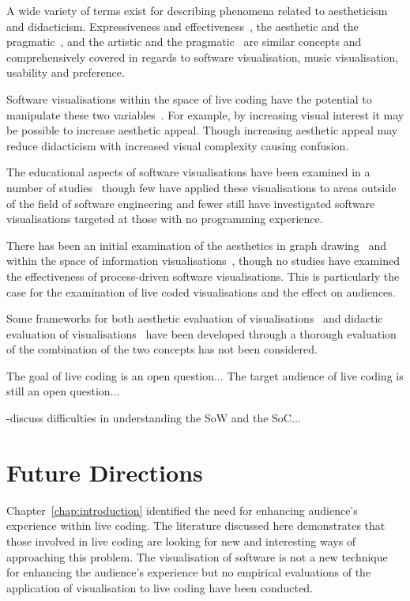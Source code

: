 A wide variety of terms exist for describing phenomena related to aestheticism and didacticism. Expressiveness and effectiveness~\cite{Hundhausen1996,Hundhausen2002}, the aesthetic and the pragmatic~\cite{Angeli2006}, and the artistic and the pragmatic~\cite{Kosara2007} are similar concepts and comprehensively covered in regards to software visualisation, music visualisation, usability and preference.

Software visualisations within the space of live coding have the potential to manipulate these two variables~\cite{Iru,McLean2010a}. For example, by increasing visual interest it may be possible to increase aesthetic appeal. Though increasing aesthetic appeal may reduce didacticism with increased visual complexity causing confusion.

The educational aspects of software visualisations have been examined in a number of studies~\cite{Baecker1998,Hundhausen2007} though few have applied these visualisations to areas outside of the field of software engineering and fewer still have investigated software visualisations targeted at those with no programming experience.

There has been an initial examination of the aesthetics in graph drawing~\cite{Purchase1996,Purchase2001} and within the space of information visualisations~\cite{Cawthon2007,Bell}, though no studies have examined the effectiveness of process-driven software visualisations. This is particularly the case for the examination of live coded visualisations and the effect on audiences.

Some frameworks for both aesthetic evaluation of visualisations~\cite{Cawthon2007,Purchase1996} and didactic evaluation of visualisations~\cite{VanWijk2005} have been developed through a thorough evaluation of the combination of the two concepts has not been considered.

The goal of live coding is an open question...
The target audience of live coding is still an open question...

-discuss difficulties in understanding the \ac{SoW} and the \ac{SoC}...

\section{Future Directions}

Chapter~\ref{chap:introduction} identified the need for enhancing audience's experience within live coding. The literature discussed here demonstrates that those involved in live coding are looking for new and interesting ways of approaching this problem. The visualisation of software is not a new technique for enhancing the audience's experience but no empirical evaluations of the application of visualisation to live coding have been conducted.

